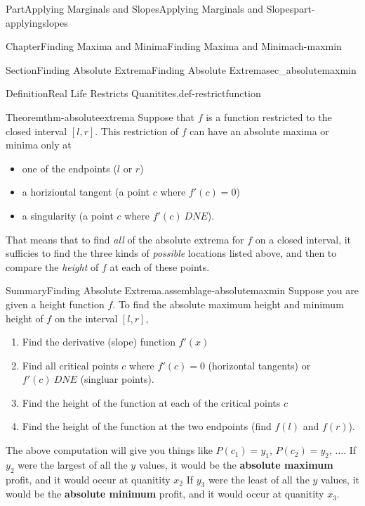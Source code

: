 \documentclass{tufte-book}
\newcommand{\terminology}[1]{\textbf{#1}}
\numberwithin{equation}{chapter}
\begin{document}
\begin{partptx}{Part}{Applying Marginals and Slopes}{}{Applying Marginals and Slopes}{}{}{part-applyingslopes}
\begin{chapterptx}{Chapter}{Finding Maxima and Minima}{}{Finding Maxima and Minima}{}{}{ch-maxmin}
\begin{sectionptx}{Section}{Finding Absolute Extrema}{}{Finding Absolute Extrema}{}{}{sec_absolutemaxmin}
\begin{definition}{Definition}{Real Life Restricts Quanitites.}{def-restrictfunction}
\begin{image}{0.25}{0.5}{0.25}{}
{
}%
\end{image}%
\end{definition}
\begin{theorem}{Theorem}{}{}{thm-absoluteextrema}%
Suppose that \(f\) is a function restricted to the closed interval \([l,r]\). This restriction of \(f\) can have an absolute maxima or minima only at%
\begin{itemize}[label=\textbullet]
\item{}one of the endpoints (\(l\) or \(r\))%
\item{}a horiziontal tangent (a point \(c\) where \(f'(c)=0\))%
\item{}a singularity (a point \(c\) where \(f'(c)\ DNE\)).%
\end{itemize}
%
\end{theorem}
That means that to find \emph{all} of the absolute extrema for \(f\) on a closed interval, it sufficies to find the three kinds of \emph{possible} locations listed above, and then to compare the \emph{height} of \(f\) at each of these points.%
\begin{assemblage}{Summary}{Finding Absolute Extrema.}{assemblage-absolutemaxmin}%
Suppose you are given a height function \(f\). To find the absolute maximum height and minimum height of \(f\) on the interval \([l,r]\),%
\begin{enumerate}
\item{}Find the derivative (slope) function \(f'(x)\)%
\item{}Find all critical points \(c\) where \(f'(c) = 0\) (horizontal tangents) or \(f'(c)\ DNE\) (singluar points).%
\item{}Find the height of the function at each of the critical points \(c\)%
\item{}Find the height of the function at the two endpoints (find \(f(l)\) and \(f(r)\)).%
\end{enumerate}
%
\par
The above computation will give you things like \(P(c_1) = y_1\), \(P(c_2) = y_2\), \(\dots\). If \(y_2\) were the largest of all the \(y\) values, it would be the \terminology{absolute maximum} profit, and it would occur at quanitity \(x_2\) If \(y_3\) were the least of all the \(y\) values, it would be the \terminology{absolute minimum} profit, and it would occur at quanitity \(x_3\).%

\end{assemblage}
\end{sectionptx}
\end{chapterptx}
\end{partptx}
\end{document}

